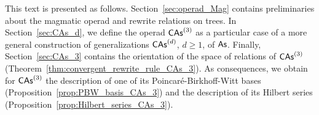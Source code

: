 This text is presented as follows. Section~\ref{sec:operad_Mag} contains
preliminaries about the magmatic operad and rewrite relations on trees.
In Section~\ref{sec:CAs_d}, we define the operad $\mathsf{CAs}^{(3)}$ as a
particular case of a more general construction of generalizations
$\mathsf{CAs}^{(d)}$, $d \geq 1$, of $\mathsf{As}$. Finally, Section~\ref{sec:CAs_3}
contains the orientation of the space of relations of
$\mathsf{CAs}^{(3)}$ (Theorem~\ref{thm:convergent_rewrite_rule_CAs_3}). As
consequences, we obtain for $\mathsf{CAs}^{(3)}$
the description of one of its Poincaré-Birkhoff-Witt bases
(Proposition~\ref{prop:PBW_basis_CAs_3}) and the description of
its Hilbert series (Proposition~\ref{prop:Hilbert_series_CAs_3}).
\medbreak
